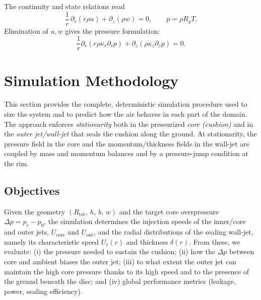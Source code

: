 \documentclass[11pt,a4paper]{article}
\begin{document}
The continuity and state relations read
\begin{equation}
  \frac{1}{r}\,\partial_r\!\left(r\rho u\right)+\partial_z(\rho w)=0,\qquad
  p=\rho R_g T.
\end{equation}
Elimination of $u,w$ gives the pressure formulation:
\begin{equation}
  \frac{1}{r}\partial_r(r\rho\kappa_r\partial_r p)+\partial_z(\rho\kappa_z\partial_z p)=0.
\end{equation}




\section{Simulation Methodology}
\label{sec:simulation-method}

This section provides the complete, deterministic simulation procedure used to size the system and to predict how the air behaves in each part of the domain. The approach enforces \emph{stationarity} both in the pressurized \emph{core (cushion)} and in the \emph{outer jet/wall-jet} that seals the cushion along the ground. At stationarity, the pressure field in the core and the momentum/thickness fields in the wall-jet are coupled by mass and momentum balances and by a pressure-jump condition at the rim.

\subsection{Objectives}
Given the geometry $(R_{\mathrm{tot}},\, h,\, b,\, w)$ and the target core overpressure $\Delta p=p_c-p_0$, the simulation determines the injection speeds of the inner/core and outer jets, $U_{\mathrm{core}}$ and $U_{\mathrm{out}}$, and the radial distributions of the sealing wall-jet, namely its characteristic speed $U_c(r)$ and thickness $\delta(r)$. From these, we evaluate: (i) the pressure needed to sustain the cushion; (ii) how the $\Delta p$ between core and ambient biases the outer jet; (iii) to what extent the outer jet can maintain the high core pressure thanks to its high speed and to the presence of the ground beneath the disc; and (iv) global performance metrics (leakage, power, sealing efficiency).
\end{document}

